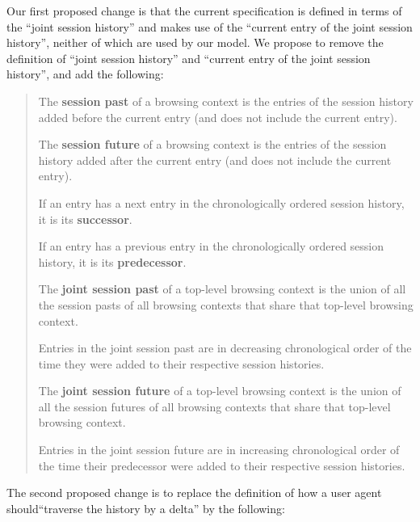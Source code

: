 \documentclass{notes}
\begin{document}
Our first proposed change is that the current specification is defined in terms
of the ``joint session history'' and makes use of the ``current entry
of the joint session history'', neither of which are used by our model.
We propose to remove the definition of ``joint session history''
and ``current entry of the joint session history'', and add the following:
\begin{quote}
  The \textbf{session past} of a browsing context is the entries
  of the session history added before the current entry
  (and does not include the current entry).

  The \textbf{session future} of a browsing context is the entries
  of the session history added after the current entry
  (and does not include the current entry).

  If an entry has a next entry in the chronologically ordered session
  history, it is its \textbf{successor}.

  If an entry has a previous entry in the chronologically ordered session
  history, it is its \textbf{predecessor}.

  The \textbf{joint session past} of a top-level browsing context is the
  union of all the session pasts of all browsing contexts
  that share that top-level browsing context.

  Entries in the joint session past are in decreasing chronological order of
  the time they were added to their respective session histories.

  The \textbf{joint session future} of a top-level browsing context is the
  union of all the session futures of all browsing contexts
  that share that top-level browsing context.

  Entries in the joint session future are in increasing chronological order of
  the time their predecessor were added to their respective session
  histories.
\end{quote}
The second proposed change is to replace the definition of how a user agent
should``traverse the history by a delta'' by the following:
\end{document}
